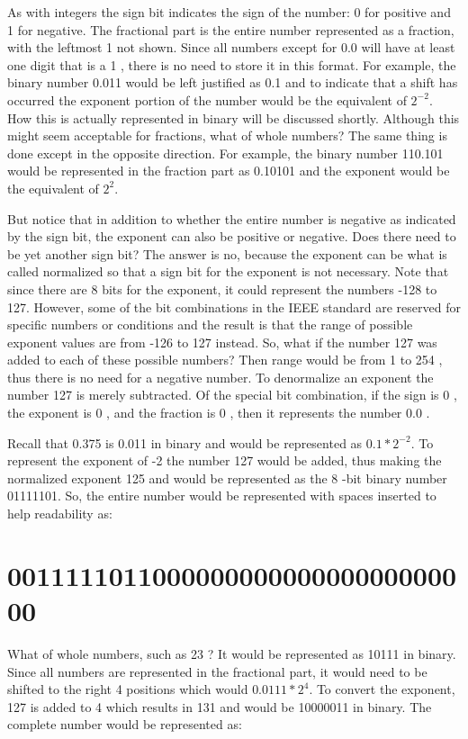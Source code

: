 \documentclass[10pt]{article}
\begin{document}
As with integers the sign bit indicates the sign of the number: 0 for positive and 1 for negative. The fractional part is the entire number represented as a fraction, with the leftmost 1 not shown. Since all numbers except for 0.0 will have at least one digit that is a 1 , there is no need to store it in this format. For example, the binary number 0.011 would be left justified as 0.1 and to indicate that a shift has occurred the exponent portion of the number would be the equivalent of $2^{-2}$. How this is actually represented in binary will be discussed shortly. Although this might seem acceptable for fractions, what of whole numbers? The same thing is done except in the opposite direction. For example, the binary number 110.101 would be represented in the fraction part as 0.10101 and the exponent would be the equivalent of $2^{2}$.

But notice that in addition to whether the entire number is negative as indicated by the sign bit, the exponent can also be positive or negative. Does there need to be yet another sign bit? The answer is no, because the exponent can be what is called normalized so that a sign bit for the exponent is not necessary. Note that since there are 8 bits for the exponent, it could represent the numbers -128 to 127. However, some of the bit combinations in the IEEE standard are reserved for specific numbers or conditions and the result is that the range of possible exponent values are from -126 to 127 instead. So, what if the number 127 was added to each of these possible numbers? Then range would be from 1 to 254 , thus there is no need for a negative number. To denormalize an exponent the number 127 is merely subtracted. Of the special bit combination, if the sign is 0 , the exponent is 0 , and the fraction is 0 , then it represents the number 0.0 .

Recall that 0.375 is 0.011 in binary and would be represented as $0.1 * 2^{-2}$. To represent the exponent of -2 the number 127 would be added, thus making the normalized exponent 125 and would be represented as the 8 -bit binary number 01111101. So, the entire number would be represented with spaces inserted to help readability as:

\section*{001111101100000000000000000000000}
What of whole numbers, such as 23 ? It would be represented as 10111 in binary. Since all numbers are represented in the fractional part, it would need to be shifted to the right 4 positions which would $0.0111 * 2^{4}$. To convert the exponent, 127 is added to 4 which results in 131 and would be 10000011 in binary. The complete number would be represented as:
\end{document}
